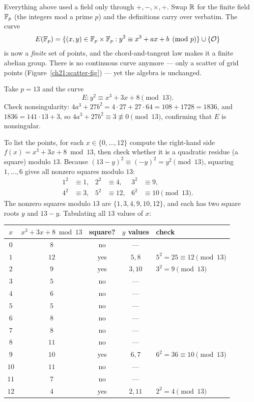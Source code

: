 Everything above used a field only through $+,-,\times,\div$. Swap $\mathbb{R}$ for the finite
field $\mathbb{F}_p$ (the integers mod a prime $p$) and the definitions carry over verbatim. The
curve
\[
E(\mathbb{F}_p) = \{(x,y) \in \mathbb{F}_p \times \mathbb{F}_p : y^2 \equiv x^3 + ax + b \pmod p\} \cup \{\mathcal{O}\}
\]
is now a \emph{finite} set of points, and the chord-and-tangent law makes it a finite
abelian group. There is no continuous curve anymore --- only a scatter of grid points
(Figure~\ref{ch21:scatter-fig}) --- yet the algebra is unchanged.

\begin{example}
\label{ch21:tinycurve}
Take $p = 13$ and the curve
\[
E : y^2 \equiv x^3 + 3x + 8 \pmod{13}.
\]
Check nonsingularity: $4a^3 + 27b^2 = 4\cdot 27 + 27\cdot 64 = 108 + 1728 = 1836$, and
$1836 = 141\cdot 13 + 3$, so $4a^3 + 27b^2 \equiv 3 \not\equiv 0 \pmod{13}$, confirming
that $E$ is nonsingular.

To list the points, for each $x \in \{0,\dots,12\}$ compute the right-hand side
$f(x)=x^3+3x+8 \bmod 13$, then check whether it is a quadratic residue (a square) modulo
$13$. Because $(13 - y)^2 \equiv (-y)^2 = y^2 \pmod{13}$, squaring $1, \dots, 6$ gives all
nonzero squares modulo $13$:
\[
\begin{aligned}
1^2 &\equiv 1, & 2^2 &\equiv 4, & 3^2 &\equiv 9,\\
4^2 &\equiv 3, & 5^2 &\equiv 12, & 6^2 &\equiv 10 \pmod{13}.
\end{aligned}
\]
The nonzero squares modulo $13$ are $\{1,3,4,9,10,12\}$, and each has two square roots
$y$ and $13 - y$. Tabulating all $13$ values of $x$:

\begin{center}
\begin{tabular}{ccccl}
\toprule
$x$ & $x^3+3x+8 \bmod 13$ & square? & $y$ values & check \\
\midrule
$0$ & $8$  & no  & --- & \\
$1$ & $12$ & yes & $5,8$ & $5^2=25\equiv12 \pmod{13}$\\
$2$ & $9$  & yes & $3,10$ & $3^2=9 \pmod{13}$ \\
$3$ & $5$  & no  & --- & \\
$4$ & $6$  & no  & --- & \\
$5$ & $5$  & no  & --- & \\
$6$ & $8$  & no  & --- & \\
$7$ & $8$  & no  & --- & \\
$8$ & $11$ & no  & --- & \\
$9$ & $10$ & yes & $6,7$ & $6^2=36\equiv10 \pmod{13}$ \\
$10$& $11$ & no  & --- & \\
$11$& $7$  & no  & --- & \\
$12$& $4$  & yes & $2,11$ & $2^2=4 \pmod{13}$ \\
\bottomrule
\end{tabular}
\end{center}


\end{example}
